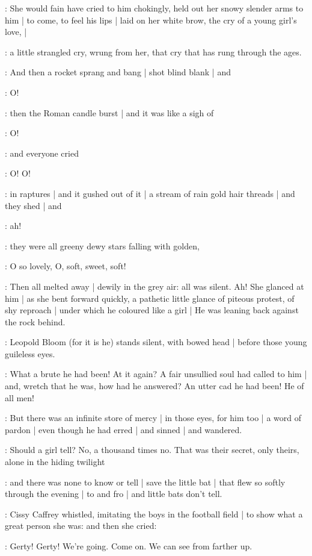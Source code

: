 \gertyNovel:
She would fain have cried to him
chokingly,
held out her snowy slender arms to him |
to come,
to feel his lips |
laid on her white brow,
the cry of a young girl's love, |

\gertySex:
a little strangled cry,
wrung from her,
that cry
that has rung through the ages.

:
And then a rocket
sprang and bang |
shot blind blank |
and

\gertySex:
O!

:
then the Roman candle burst |
and it was like a sigh of

\gertySex:
O!

:
and everyone cried

\All:
O!
O!

:
in raptures |
and it gushed out of it |
a stream of rain gold hair threads |
and they shed |
and

\All:
ah!

:
they were
all greeny dewy stars falling with golden,%

\gertySex:
O so lovely,
O,
soft,
sweet,
soft!

\Nnovel:
Then all melted away |
dewily in the grey air:
all was silent.
Ah!
She glanced at him |
as she bent forward quickly,
a pathetic little glance of piteous protest,
of shy reproach |
under which he coloured like a girl |
He was leaning back against the rock behind.

:
Leopold Bloom
(for it is he)
stands silent,
with bowed head |
before those young guileless eyes.

\Nnovel:
What a brute he had been!
At it again?
A fair unsullied soul had called to him |
and,
wretch that he was,
how had he answered?
An utter cad
he had been!
He of all men!

:
But there was an infinite store of mercy |
in those eyes,
for him too |
a word of pardon |
even though he had erred |
and sinned |
and wandered.

\gertyNovel:
Should a girl tell?%
No,
a thousand times no.
That was their secret,
only theirs,
alone in the hiding twilight

:
and there was none to know or tell |
save the little bat |
that flew so softly through the evening |
to and fro |
and little bats don't tell.

:
Cissy Caffrey whistled,
imitating the boys in the football field |
to show what a great person she was:
and then she cried:

\cissy:
Gerty!
Gerty!
We're going.
Come on.
We can see from farther up.

